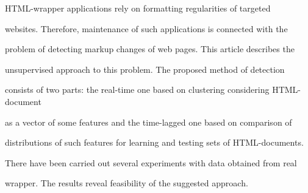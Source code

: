 \vspace*{-2pt}





\noindent 


HTML-wrapper applications rely on formatting regularities of targeted 


websites. Therefore, maintenance of such applications is connected with the 


problem of detecting markup changes of web pages. This article describes the 


unsupervised approach to this problem. The proposed method of detection 


consists of two parts: the real-time one based on clustering considering HTML-document 


as a vector of some features and the time-lagged one based on comparison of 


distributions of such features for learning and testing sets of HTML-documents. 


There have been carried out several experiments with data obtained from real 


wrapper. The results reveal feasibility of the suggested approach.








\vspace*{-5pt}




































\def\tit{BUILDING REAL-TIME NEWS RECOMMENDATION SERVICE USING NoSQL DBMS}





